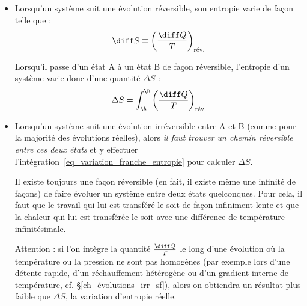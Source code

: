 		\begin{itemize}
			\item Lorsqu’un système suit une évolution réversible, son entropie varie de façon telle que :
				\begin{equation}
					\diff S \equiv \left( \frac{\diff Q}{T} \right)_\text{rév.}
					\label{def_entropie}
				\end{equation}
				{\small%
				}

				Lorsqu’il passe d’un état A à un état B de façon réversible, l’entropie d’un système varie donc d’une quantité $\Delta S$ :	
				\begin{equation}
					\Delta S = \int_\A^\B \left( \frac{\diff Q}{T} \right)_\text{rév.}
					\label{eq_variation_franche_entropie}
				\end{equation}

			\item Lorsqu’un système suit une évolution irréversible entre A et B (comme pour la majorité des évolutions réelles), alors \emph{il faut trouver un chemin réversible entre ces deux états} et y effectuer l’intégration~\ref{eq_variation_franche_entropie} pour calculer $\Delta S$.

				Il existe toujours une façon réversible (en fait, il existe même une infinité de façons) de faire évoluer un système entre deux états quelconques. Pour cela, il faut que le travail qui lui est transféré le soit de façon infiniment lente et que la chaleur qui lui est transférée le soit avec une différence de température infinitésimale.
				
				Attention : si l’on intègre la quantité $\frac{\diff Q}{T}$ le long d’une évolution où la température ou la pression ne sont pas homogènes (par exemple lors d’une détente rapide, d’un réchauffement hétérogène ou d’un gradient interne de température, cf. \S\ref{ch_évolutions_irr_sf}), alors on obtiendra un résultat plus faible que $\Delta S$, la variation d’entropie réelle.
				
			\end{itemize}


